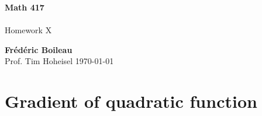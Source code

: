 \documentclass{article}
\begin{document}
	\begin{titlepage}
		\begin{center}
			\vspace*{1cm}
			\textbf{Math 417}\\
			\\
			\vspace{0.5cm}
			Homework X
			
			\vspace{1.5cm}
			
			\textbf{Frédéric Boileau}\\
			\vspace{2cm}
			Prof. 
			Tim Hoheisel
			\vfill
			\today
			\thispagestyle{empty}
		\end{center}
	\end{titlepage}
	\newpage
	\tableofcontents
	\thispagestyle{empty}
	\clearpage
	
	\section{Gradient of quadratic function}
	
\end{document}
